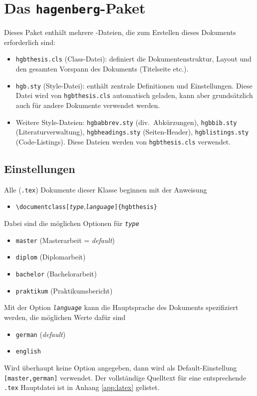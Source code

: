 \section{Das {\tt hagenberg}-Paket}

Dieses Paket enthält mehrere \latex-Dateien, die 
zum Erstellen dieses Dokuments erforderlich sind:
%
\begin{itemize}
\item \nolinkurl{hgbthesis.cls} (Class-Datei): definiert die 
		Dokumentenstruktur, Layout und den gesamten Vorspann des Dokuments (Titelseite etc.).
\item \nolinkurl{hgb.sty} (Style-Datei): enthält zentrale Definitionen und Einstellungen. 
		Diese Datei wird von \nolinkurl{hgbthesis.cls} automatisch geladen, kann 
		aber grundsätzlich auch für andere Dokumente verwendet werden.
\item Weitere Style-Dateien:
	\nolinkurl{hgbabbrev.sty} (div.\ Abkürzungen),
	\nolinkurl{hgbbib.sty} (Literaturverwaltung),
	\nolinkurl{hgbheadings.sty} (Seiten-Header),
	\nolinkurl{hgblistings.sty} (Code-Listings).
	Diese Dateien werden von \nolinkurl{hgbthesis.cls} verwendet.
\end{itemize}


\subsection{Einstellungen}
\label{sec:HagenbergEinstellungen}


Alle (\verb!.tex!) Dokumente dieser Klasse beginnen mit der Anweisung
%
\begin{itemize}
\item[] \verb!\documentclass[!\texttt{\emph{type}},\texttt{\emph{language}}\verb!]{hgbthesis}! 
\end{itemize}
%
Dabei sind die möglichen Optionen für \texttt{\emph{type}} 
%
\begin{itemize}
\item[] \verb!master! (Masterarbeit = \emph{default})
\item[] \verb!diplom! (Diplomarbeit)
\item[] \verb!bachelor! (Bachelorarbeit)
\item[] \verb!praktikum! (Praktikumsbericht)
\end{itemize}
%
Mit der Option \texttt{\emph{language}} kann die Hauptsprache des Dokuments spezifiziert werden, 
die möglichen Werte dafür sind
%
\begin{itemize}
\item[] \verb!german! (\emph{default})
\item[] \verb!english!
\end{itemize}
%
Wird überhaupt keine Option angegeben, dann wird als Default-Einstellung 
\texttt{[master,german]}
verwendet.
Der vollständige Quelltext für eine entsprechende \verb!.tex! Hauptdatei ist in Anhang \ref{app:latex} 
gelistet.


